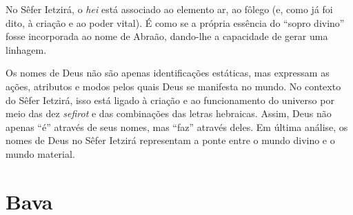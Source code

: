 No Sêfer Ietzirá, o \textit{hei} está associado ao elemento ar, ao fôlego (e, como já foi dito, à criação e ao poder vital). É como se a própria essência do ``sopro divino'' fosse incorporada ao nome de Abraão, dando-lhe a capacidade de gerar uma linhagem.


Os nomes de Deus não são apenas identificações estáticas, mas expressam as ações, atributos e modos pelos quais Deus se manifesta no mundo. No contexto do Sêfer Ietzirá, isso está ligado à criação e ao funcionamento do universo por meio das dez \textit{sefirot} e das combinações das letras hebraicas. Assim, Deus não apenas ``é'' através de seus nomes, mas ``faz'' através deles. Em última análise, os nomes de Deus no Sêfer Ietzirá representam a ponte entre o mundo divino e o mundo material.

\chapter*{Bava \smallskip{}}

\lipsum[2]



